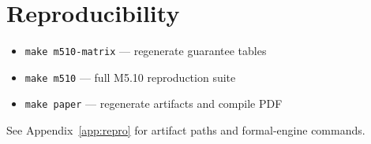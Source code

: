 \section{Reproducibility}
\label{sec:repro}

\begin{itemize}
  \item \texttt{make m510-matrix} --- regenerate guarantee tables
  \item \texttt{make m510} --- full M5.10 reproduction suite
  \item \texttt{make paper} --- regenerate artifacts and compile PDF
\end{itemize}



See Appendix~\ref{app:repro} for artifact paths and formal-engine commands.
